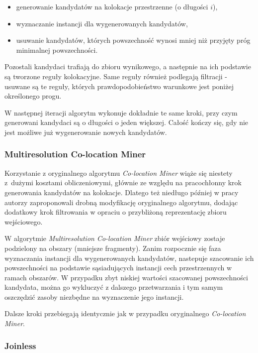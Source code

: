 \documentclass[12pt]{article}
\begin{document}
\begin{itemize}
\item generowanie kandydatów na kolokacje przestrzenne (o długości $i$),
\item wyznaczanie instancji dla wygenerowanych kandydatów,
\item usuwanie kandydatów, których powszechność wynosi mniej niż przyjęty próg minimalnej powszechności.
\end{itemize}

Pozostali kandydaci trafiają do zbioru wynikowego, a następnie na ich podstawie są tworzone reguły kolokacyjne. Same reguły również podlegają filtracji - usuwane są te reguły, których prawdopodobieństwo warunkowe jest poniżej określonego progu. 

W następnej iteracji algorytm wykonuje dokładnie te same kroki, przy czym generowani kandydaci są o długości o jeden większej. Całość kończy się, gdy nie jest możliwe już wygenerowanie nowych kandydatów.

\subsubsection{Multiresolution Co-location Miner}

Korzystanie z oryginalnego algorytmu \textit{Co-location Miner} wiąże się niestety z~dużymi kosztami obliczeniowymi, głównie ze względu na pracochłonny krok generowania kandydatów na kolokacje. Dlatego też niedługo później w pracy \cite{multihuang} autorzy zaproponowali drobną modyfikację oryginalnego algorytmu, dodając dodatkowy krok filtrowania w opraciu o przybliżoną reprezentację zbioru wejściowego.

W algorytmie \textit{Multiresolution Co-location Miner} zbiór wejściowy zostaje podzielony na obszary (mniejsze fragmenty). Zanim rozpocznie się faza wyznaczania instancji dla wygenerowanych kandydatów, nastepuje szacowanie ich powszechności na podstawie sąsiadujących instancji cech przestrzennych w ramach obszarów. W przypadku zbyt niskiej wartości szacowanej powszechności kandydata, można go wykluczyć z dalszego przetwarzania i tym samym oszczędzić zasoby niezbędne na wyznaczenie jego instancji.

Dalsze kroki przebiegają identycznie jak w przypadku oryginalnego \textit{Co-location Miner}.

\subsubsection{Joinless}
\end{document}
